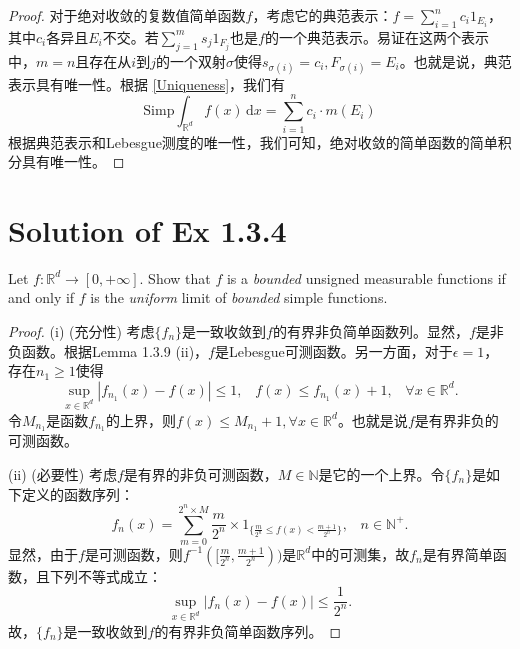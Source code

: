\documentclass[reqno,a4paper,10pt]{amsart}
\newcommand\dif{\,\mathrm{d}}
\newcommand\Rnum{\mathbb{R}}
\newcommand{\abs}[1]{\left\vert#1\right\vert}
\begin{document}
\begin{proof}
    对于绝对收敛的复数值简单函数$f$，考虑它的典范表示：$f=\sum_{i=1}^n c_i 1_{E_i}$，其中$c_i$各异且$E_i$不交。若$\sum_{j=1}^m s_j 1_{F_j}$也是$f$的一个典范表示。易证在这两个表示中，$m=n$且存在从$i$到$j$的一个双射$\sigma$使得$s_{\sigma(i)}=c_i, F_{\sigma(i)}=E_i$。也就是说，典范表示具有唯一性。根据 \eqref{Uniqueness}，我们有
    \begin{equation*}
        \mathrm{Simp}\int_{\mathbb{R}^d}  f(x)\dif x = \sum_{i=1}^n c_i \cdot m(E_i)
    \end{equation*}
    根据典范表示和Lebesgue测度的唯一性，我们可知，绝对收敛的简单函数的简单积分具有唯一性。
\end{proof}



\section{Solution of Ex 1.3.4}\label{1.3.4}
Let $f: \mathbb{R}^d\to [0,+\infty]$. Show that $f$ is a \textit{bounded} unsigned measurable functions if and only if $f$ is the \textit{uniform} limit of \textit{bounded} simple functions.
\begin{proof}
    (i) (充分性) 考虑$\{f_n\}$是一致收敛到$f$的有界非负简单函数列。显然，$f$是非负函数。根据Lemma 1.3.9 (ii)，$f$是Lebesgue可测函数。另一方面，对于$\epsilon=1$，存在$n_1\geq 1$使得
    \begin{equation*}
        \sup_{x\in\mathbb{R}^d}\abs{f_{n_1}(x)-f(x)}\leq 1,\;\;\; f(x)\leq f_{n_1}(x)+1,\;\;\; \forall x\in\mathbb{R}^d.
    \end{equation*}
    令$M_{n_1}$是函数$f_{n_1}$的上界，则$f(x)\leq M_{n_1}+1, \forall x\in\mathbb{R}^d$。也就是说$f$是有界非负的可测函数。

    (ii) (必要性) 考虑$f$是有界的非负可测函数，$M\in\mathbb{N}$是它的一个上界。令$\{f_n\}$是如下定义的函数序列：
    \begin{equation*}
        f_n(x)=\sum_{m=0}^{2^n\times M} \frac{m}{2^n}\times 1_{\{\frac{m}{2^n}\leq f(x)<\frac{m+1}{2^n}\}},\;\;\; n\in\mathbb{N}^+.
    \end{equation*}
    显然，由于$f$是可测函数，则$f^{-1}([\frac{m}{2^n},\frac{m+1}{2^n}))$是$\Rnum^d$中的可测集，故$f_n$是有界简单函数，且下列不等式成立：
    \begin{equation*}
        \sup_{x\in\Rnum^d}\abs{f_n(x)-f(x)}\leq \frac{1}{2^n}.
    \end{equation*}
    故，$\{f_n\}$是一致收敛到$f$的有界非负简单函数序列。
\end{proof}
\end{document}
